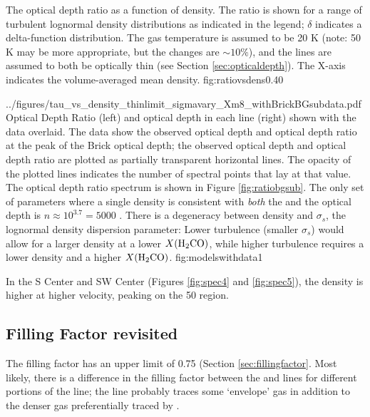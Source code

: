 {The optical depth ratio as a function of \hh density.  The ratio is shown for
a range of turbulent lognormal density distributions as indicated in the legend;
$\delta$ indicates a delta-function distribution.
The gas temperature is assumed to be 20 K (note: 50 K may be more appropriate, but the changes
are $\sim10\%$), and the \formaldehyde lines
are assumed to both be optically thin (see Section \ref{sec:opticaldepth}).
The X-axis indicates the volume-averaged mean \hh density. }
{fig:ratiovsdens}{0.4}{0}

          {../figures/tau_vs_density_thinlimit_sigmavary_Xm8_withBrickBGsubdata.pdf}
{Optical Depth Ratio (left) and optical depth in each line (right) shown with the
data overlaid.  The data show the observed optical depth and optical depth ratio
at the peak of the Brick \oneone optical depth; the observed optical depth and
optical depth ratio are plotted as partially transparent horizontal lines.  The
opacity of the plotted lines indicates the number of spectral points that lay
at that value.  The optical depth ratio spectrum is shown in Figure
\ref{fig:ratiobgsub}.  The only set of parameters where a single density is
consistent with \emph{both} the \oneone and the \twotwo optical depth is
$n\approx10^{3.7} = 5000$ \percc.  There is a degeneracy between density and
$\sigma_s$, the lognormal density dispersion parameter: Lower turbulence
(smaller $\sigma_s$) would allow for a larger density at a lower
$X(\textrm{H}_2\textrm{CO})$, while higher turbulence requires a lower density and a
higher $X(\textrm{H}_2\textrm{CO})$.
}
{fig:modelswithdata}{1}


In the S Center and SW Center (Figures \ref{fig:spec4} and \ref{fig:spec5}),
the density is higher at higher velocity, peaking on the 50 \kms region.

\subsection{Filling Factor revisited}
The filling factor has an upper limit of 0.75 (Section \ref{sec:fillingfactor}.
Most likely, there is a difference in the filling factor between the \oneone
and \twotwo lines for different portions of the line; the \oneone line probably
traces some `envelope' gas in addition to the denser gas preferentially traced
by \twotwo.  

